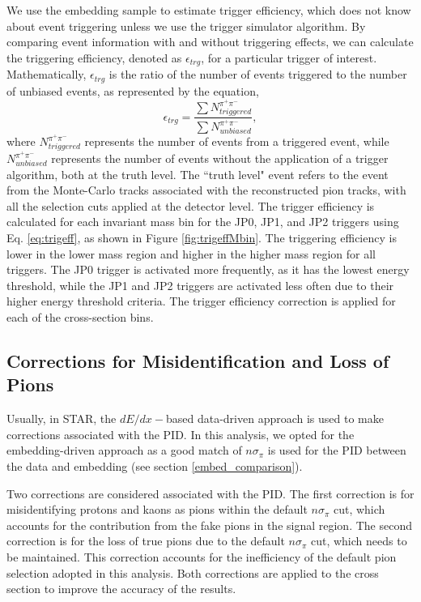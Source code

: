  We use the embedding sample to estimate trigger efficiency, which does not know about event triggering unless we use the trigger simulator algorithm. By comparing event information with and without triggering effects, we can calculate the triggering efficiency, denoted as $\epsilon_{trg}$, for a particular trigger of interest. Mathematically, $\epsilon_{trg}$ is the ratio of the number of events triggered to the number of unbiased events, as represented by the equation,
 \begin{equation}
     \epsilon_{trg} = \frac{\sum N^{\pi^+\pi^-}_{triggered}}{\sum N^{\pi^+\pi^-}_{unbiased}},
     \label{eq:trigeff}
 \end{equation}
where $N_{triggered}^{\pi^+\pi^-}$ represents the number of \dipion events from a triggered event, while $N_{unbiased}^{\pi^+\pi^-}$ represents the number of \dipion events without the application of a trigger algorithm, both at the truth level. The ``truth level" event refers to the \dipion event from the Monte-Carlo tracks associated with the reconstructed  pion tracks, with all the selection cuts applied at the detector level. The trigger efficiency is calculated for each invariant mass bin for the JP0, JP1, and JP2 triggers using Eq. \ref{eq:trigeff}, as shown in Figure \ref{fig:trigeffMbin}. The triggering efficiency is lower in the lower mass region and higher in the higher mass region for all triggers. The JP0 trigger is activated more frequently, as it has the lowest energy threshold, while the JP1 and JP2 triggers are activated less often due to their higher energy threshold criteria. The trigger efficiency correction is applied for each of the cross-section bins.


\subsection{Corrections for Misidentification and Loss of Pions}
Usually, in STAR, the $dE/dx -$based data-driven approach is used to make corrections associated with the PID. In this analysis, we opted for the embedding-driven approach as a good match of $n\sigma_\pi$ is used for the PID between the data and embedding (see section \ref{embed_comparison}).

Two corrections are considered associated with the PID. The first correction is for misidentifying protons and kaons as pions within the default $n\sigma_\pi$ cut, which accounts for the contribution from the fake pions in the signal region. The second correction is for the loss of true pions due to the default $n\sigma_\pi$ cut, which needs to be maintained. This correction accounts for the inefficiency of the default pion selection adopted in this analysis. Both corrections are applied to the cross section to improve the accuracy of the results. 

